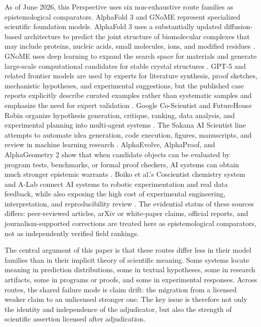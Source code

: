\documentclass[11pt,a4paper]{article}
\begin{document}
As of June 2026, this Perspective uses six non-exhaustive route families as epistemological comparators. AlphaFold 3 \citep{Abramson2024AlphaFold3} and GNoME \citep{Merchant2023GNoME} represent specialized scientific foundation models. AlphaFold 3 uses a substantially updated diffusion-based architecture to predict the joint structure of biomolecular complexes that may include proteins, nucleic acids, small molecules, ions, and modified residues \citep{Abramson2024AlphaFold3}. GNoME uses deep learning to expand the search space for materials and generate large-scale computational candidates for stable crystal structures \citep{Merchant2023GNoME}. GPT-5 and related frontier models are used by experts for literature synthesis, proof sketches, mechanistic hypotheses, and experimental suggestions, but the published case reports explicitly describe curated examples rather than systematic samples and emphasize the need for expert validation \citep{Bubeck2025GPT5Science,OpenAI2025ScienceGPT5}. Google Co-Scientist and FutureHouse Robin organize hypothesis generation, critique, ranking, data analysis, and experimental planning into multi-agent systems \citep{Gottweis2026CoScientist,Ghareeb2026Robin}. The Sakana AI Scientist line attempts to automate idea generation, code execution, figures, manuscripts, and review in machine learning research \citep{Lu2026AIScientist}. AlphaEvolve, AlphaProof, and AlphaGeometry 2 show that when candidate objects can be evaluated by program tests, benchmarks, or formal proof checkers, AI systems can obtain much stronger epistemic warrants \citep{Novikov2025AlphaEvolve,Hubert2026AlphaProof}. Boiko et al.'s Coscientist chemistry system and A-Lab connect AI systems to robotic experimentation and real data feedback, while also exposing the high cost of experimental engineering, interpretation, and reproducibility review \citep{Boiko2023Coscientist,Szymanski2023ALab,Chawla2026ALabCorrection}. The evidential status of these sources differs: peer-reviewed articles, arXiv or white-paper claims, official reports, and journalism-supported corrections are treated here as epistemological comparators, not as independently verified field rankings.

The central argument of this paper is that these routes differ less in their model families than in their implicit theory of scientific meaning. Some systems locate meaning in prediction distributions, some in textual hypotheses, some in research artifacts, some in programs or proofs, and some in experimental responses. Across routes, the shared failure mode is claim drift: the migration from a licensed weaker claim to an unlicensed stronger one. The key issue is therefore not only the identity and independence of the adjudicator, but also the strength of scientific assertion licensed after adjudication.
\end{document}
